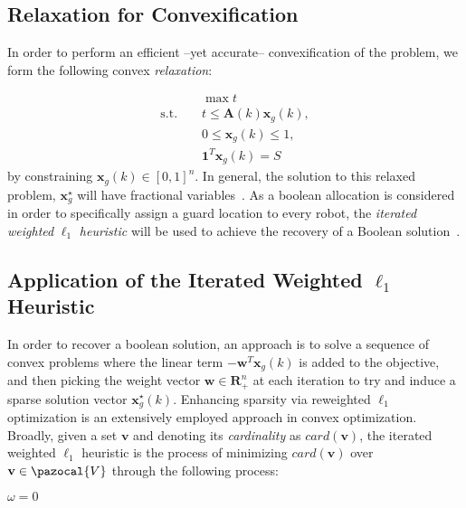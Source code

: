 \documentclass[letterpaper, 10 pt, conference]{ieeeconf}  %
\newcommand{\Vs}{\pazocal{V}}
\begin{document}
\subsection{Relaxation for Convexification}\label{sec:relaxation}

In order to perform an efficient --yet accurate-- convexification of the problem, we form the following convex \emph{relaxation}:

\begin{eqnarray}
 &&\max t \\ \nonumber
 \textrm{s.t.~} && t\le \mathbf{A}(k)\mathbf{x}_g(k),\\ \nonumber && 0\le \mathbf{x}_g(k)\le 1,\\ \nonumber && \mathbf{1}^T\mathbf{x}_g(k)=S
\end{eqnarray}
\noindent by constraining $\mathbf{x}_g(k)\in [0,1]^n$. In general, the solution to this relaxed problem, $\mathbf{x}_g^\star$ will have fractional variables~\cite{cvxbook}. As a boolean allocation is considered in order to specifically assign a guard location to every robot, the \emph{iterated weighted} $\ell_1$ \emph{heuristic} will be used to achieve the recovery of a Boolean solution~\cite{cvxbook}. 



\subsection{Application of the Iterated Weighted $\ell_1$ Heuristic}	

In order to recover a boolean solution, an approach is to solve a sequence of convex problems where the linear term $-\mathbf{w}^T\mathbf{x}_g(k)$ is added to the objective, and then picking the weight vector $\mathbf{w}\in\mathbf{R}^n_+$ at each iteration to try and induce a sparse solution vector $\mathbf{x}_g^\star (k)$. Enhancing sparsity via reweighted $\ell_1$ optimization is an extensively employed approach in convex optimization. Broadly, given a set $\mathbf{v}$ and denoting its \emph{cardinality} as $card(\mathbf{v})$, the iterated weighted $\ell_1$ heuristic is the process of minimizing $card(\mathbf{v})$ over $\mathbf{v}\in \Vs$ through the following process: 

\begin{algorithm}[h]
\label{alg:loneheur}
\begin{algorithmic}[1]
\State $\omega = 0$
	\State{minimize $||\mathbf{diag}(\omega)\mathbf{v}||_1$ over $\mathbf{v}\in \Vs$}
\EndWhile
\end{algorithmic}
\end{algorithm}
\end{document}
